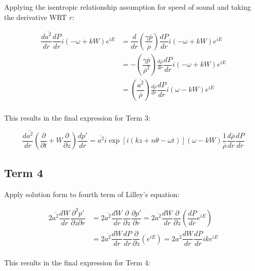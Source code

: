 \documentclass[]{aiaa-tc}%
\begin{document}
Applying the isentropic relationship assumption for speed of sound and taking the derivative WRT $r$:

\begin{align*}
\dfrac{d \overline{a^2}}{dr} \dfrac{dP}{dr}
    i(-\omega + kW) e^{iE}
&= \dfrac{d}{dr} \left(\dfrac{\gamma \overline{p}}{\overline{\rho}}\right)
    \dfrac{dP}{dr} i(-\omega + kW) e^{iE} \\
&= -\left(\dfrac{\gamma \overline{p}}{\overline{\rho}^2}\right) \frac{d \overline{\rho}}{dr}
    \dfrac{dP}{dr} i(-\omega + kW) e^{iE} \\
&= \left(\dfrac{\overline{a^2}}{\overline{\rho}}\right) \frac{d \overline{\rho}}{dr} \dfrac{dP}{dr} i(\omega - kW) e^{iE} \\
\end{align*}

This results in the final expression for Term 3:

\begin{equation} \label{term3soln}
\boxed{\dfrac{d \overline{a^2}}{dr} \left( \dfrac{\partial}{\partial t} + W \dfrac{\partial}{\partial z} \right) \dfrac{dp'}{dr}
= \overline{a^2} i\exp[i(kz + n\theta -\omega t)] (\omega - kW)
    \dfrac{1}{\overline{\rho}}\frac{d \overline{\rho}}{dr} \dfrac{dP}{dr} }
\end{equation}




\subsection{Term 4}

Apply solution form to fourth term of Lilley's equation:


\begin{align*}
2\overline{a^2} \dfrac{dW}{dr}\dfrac{\partial^2 p'}{\partial z \partial r}
  &= 2\overline{a^2} \dfrac{dW}{dr} \dfrac{\partial }{\partial z}
    \dfrac{\partial p'}{\partial r}
    = 2\overline{a^2} \dfrac{dW}{dr} \dfrac{\partial }{\partial z}
    \left( \dfrac{dP}{dr} e^{iE} \right) \\
&= 2\overline{a^2} \dfrac{dW}{dr} \dfrac{dP}{dr}
    \dfrac{\partial }{\partial z} \left( e^{iE} \right)
    = 2\overline{a^2} \dfrac{dW}{dr} \dfrac{dP}{dr} ike^{iE}      \\
\end{align*}

This results in the final expression for Term 4:
\end{document}
